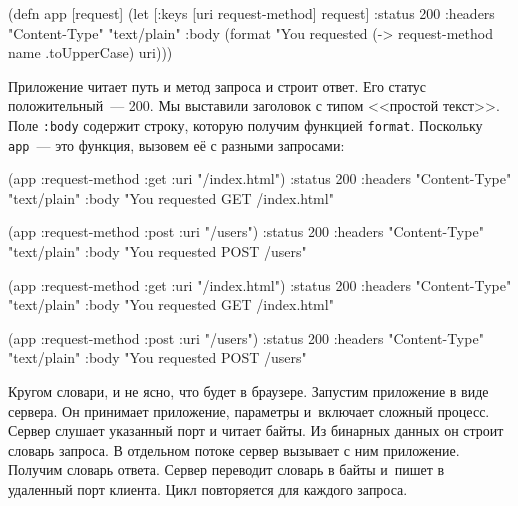 \else

\begin{english}
  \begin{clojure}
(defn app [request]
  (let [{:keys [uri request-method]} request]
    {:status 200
     :headers {"Content-Type" "text/plain"}
     :body (format "You requested %
                   (-> request-method name .toUpperCase)
                   uri)}))
  \end{clojure}
\end{english}

\fi

Приложение читает путь и метод запроса и строит ответ. Его статус
положительный~--- 200. Мы выставили заголовок с типом <<простой текст>>. Поле
\verb|:body| содержит строку, которую получим функцией
\verb|format|. Поскольку \verb|app|~--- это функция, вызовем её с разными
запросами:

\ifx\DEVICETYPE\MOBILE

\begin{english}
  \begin{clojure}
(app {:request-method :get
      :uri "/index.html"})
{:status 200
 :headers {"Content-Type" "text/plain"}
 :body "You requested GET /index.html"}

(app {:request-method :post
      :uri "/users"})
{:status 200
 :headers {"Content-Type" "text/plain"}
 :body "You requested POST /users"}
  \end{clojure}
\end{english}

\else

\begin{english}
  \begin{clojure}
(app {:request-method :get :uri "/index.html"})
{:status 200
 :headers {"Content-Type" "text/plain"}
 :body "You requested GET /index.html"}

(app {:request-method :post :uri "/users"})
{:status 200
 :headers {"Content-Type" "text/plain"}
 :body "You requested POST /users"}
  \end{clojure}
\end{english}

\fi


Кругом словари, и не ясно, что будет в браузере. Запустим приложение в виде
сервера. Он принимает приложение, параметры и~включает сложный процесс. Сервер
слушает указанный порт и читает байты. Из бинарных данных он строит словарь
запроса. В отдельном потоке сервер вызывает с ним приложение. Получим словарь
ответа. Сервер переводит словарь в байты и~пишет в удаленный порт клиента. Цикл
повторяется для каждого запроса.


